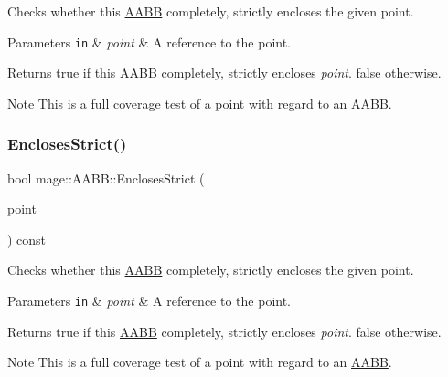 Checks whether this \hyperlink{structmage_1_1_a_a_b_b}{A\+A\+BB} completely, strictly encloses the given point.


\begin{DoxyParams}[1]{Parameters}
\mbox{\tt in}  & {\em point} & A reference to the point. \\
\hline
\end{DoxyParams}
\begin{DoxyReturn}{Returns}
{\ttfamily true} if this \hyperlink{structmage_1_1_a_a_b_b}{A\+A\+BB} completely, strictly encloses {\itshape point}. {\ttfamily false} otherwise. 
\end{DoxyReturn}
\begin{DoxyNote}{Note}
This is a full coverage test of a point with regard to an \hyperlink{structmage_1_1_a_a_b_b}{A\+A\+BB}. 
\end{DoxyNote}
\hypertarget{structmage_1_1_a_a_b_b_a65616922dfc15d46c611764c12d50ec1}{}\label{structmage_1_1_a_a_b_b_a65616922dfc15d46c611764c12d50ec1} 
\subsubsection{\texorpdfstring{Encloses\+Strict()}{EnclosesStrict()}\hspace{0.1cm}{\footnotesize\ttfamily [2/4]}}
{\footnotesize\ttfamily bool mage\+::\+A\+A\+B\+B\+::\+Encloses\+Strict (\begin{DoxyParamCaption}\item[{F\+X\+M\+V\+E\+C\+T\+OR}]{point }\end{DoxyParamCaption}) const\hspace{0.3cm}{\ttfamily [noexcept]}}

Checks whether this \hyperlink{structmage_1_1_a_a_b_b}{A\+A\+BB} completely, strictly encloses the given point.


\begin{DoxyParams}[1]{Parameters}
\mbox{\tt in}  & {\em point} & A reference to the point. \\
\hline
\end{DoxyParams}
\begin{DoxyReturn}{Returns}
{\ttfamily true} if this \hyperlink{structmage_1_1_a_a_b_b}{A\+A\+BB} completely, strictly encloses {\itshape point}. {\ttfamily false} otherwise. 
\end{DoxyReturn}
\begin{DoxyNote}{Note}
This is a full coverage test of a point with regard to an \hyperlink{structmage_1_1_a_a_b_b}{A\+A\+BB}. 
\end{DoxyNote}
\hypertarget{structmage_1_1_a_a_b_b_af037df0800e1e8c3564363f154c2424a}{}\label{structmage_1_1_a_a_b_b_af037df0800e1e8c3564363f154c2424a} 
